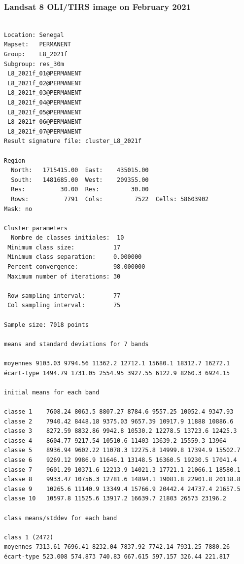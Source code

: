 \documentclass[land,article,submit,pdftex,moreauthors]{Definitions/mdpi}
\begin{document}
\subsubsection[\appendixname~\thesubsubsection]{Landsat 8 OLI/TIRS image on February 2021}
\begin{scriptsize}
\begin{verbatim}

Location: Senegal
Mapset:   PERMANENT
Group:    L8_2021f
Subgroup: res_30m
 L8_2021f_01@PERMANENT
 L8_2021f_02@PERMANENT
 L8_2021f_03@PERMANENT
 L8_2021f_04@PERMANENT
 L8_2021f_05@PERMANENT
 L8_2021f_06@PERMANENT
 L8_2021f_07@PERMANENT
Result signature file: cluster_L8_2021f

Region
  North:   1715415.00  East:    435015.00
  South:   1481685.00  West:    209355.00
  Res:          30.00  Res:         30.00
  Rows:          7791  Cols:         7522  Cells: 58603902
Mask: no

Cluster parameters
  Nombre de classes initiales: 	10
 Minimum class size:           17
 Minimum class separation:     0.000000
 Percent convergence:          98.000000
 Maximum number of iterations: 30

 Row sampling interval:        77
 Col sampling interval:        75

Sample size: 7018 points

means and standard deviations for 7 bands

moyennes 9103.03 9794.56 11362.2 12712.1 15680.1 18312.7 16272.1
écart-type 1494.79 1731.05 2554.95 3927.55 6122.9 8260.3 6924.15

initial means for each band

classe 1    7608.24 8063.5 8807.27 8784.6 9557.25 10052.4 9347.93
classe 2    7940.42 8448.18 9375.03 9657.39 10917.9 11888 10886.6
classe 3    8272.59 8832.86 9942.8 10530.2 12278.5 13723.6 12425.3
classe 4    8604.77 9217.54 10510.6 11403 13639.2 15559.3 13964
classe 5    8936.94 9602.22 11078.3 12275.8 14999.8 17394.9 15502.7
classe 6    9269.12 9986.9 11646.1 13148.5 16360.5 19230.5 17041.4
classe 7    9601.29 10371.6 12213.9 14021.3 17721.1 21066.1 18580.1
classe 8    9933.47 10756.3 12781.6 14894.1 19081.8 22901.8 20118.8
classe 9    10265.6 11140.9 13349.4 15766.9 20442.4 24737.4 21657.5
classe 10   10597.8 11525.6 13917.2 16639.7 21803 26573 23196.2

class means/stddev for each band

class 1 (2472)
moyennes 7313.61 7696.41 8232.04 7837.92 7742.14 7931.25 7880.26
écart-type 523.008 574.873 740.83 667.615 597.157 326.44 221.817


\end{verbatim}
\end{scriptsize}
\end{document}
